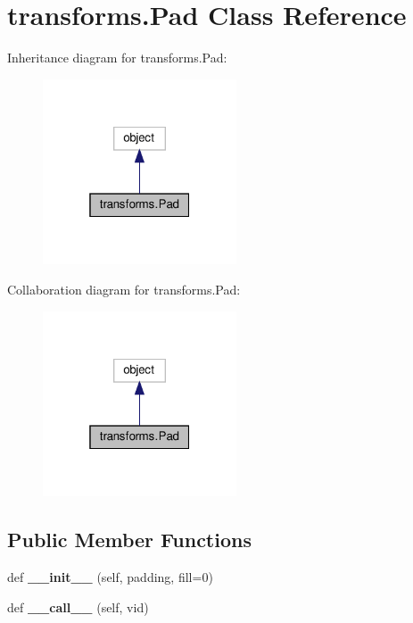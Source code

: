 \hypertarget{classtransforms_1_1Pad}{}\section{transforms.\+Pad Class Reference}
\label{classtransforms_1_1Pad}


Inheritance diagram for transforms.\+Pad\+:
\nopagebreak
\begin{figure}[H]
\begin{center}
\leavevmode
\includegraphics[width=163pt]{classtransforms_1_1Pad__inherit__graph}
\end{center}
\end{figure}


Collaboration diagram for transforms.\+Pad\+:
\nopagebreak
\begin{figure}[H]
\begin{center}
\leavevmode
\includegraphics[width=163pt]{classtransforms_1_1Pad__coll__graph}
\end{center}
\end{figure}
\subsection*{Public Member Functions}
\begin{DoxyCompactItemize}
\item 
\mbox{\label{classtransforms_1_1Pad_a33e424bdb9d4c8eea67f8e8c95e42a9b}} 
def {\bfseries \+\_\+\+\_\+init\+\_\+\+\_\+} (self, padding, fill=0)
\item 
\mbox{\label{classtransforms_1_1Pad_ab12e1dff3de6d8334857b66ac86fe4f7}} 
def {\bfseries \+\_\+\+\_\+call\+\_\+\+\_\+} (self, vid)
\end{DoxyCompactItemize}
